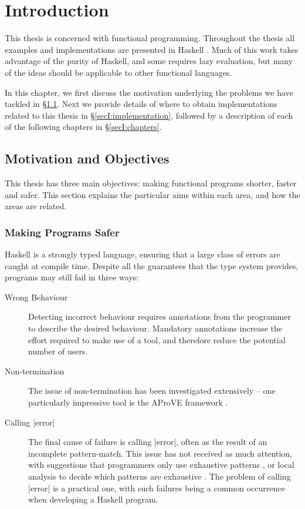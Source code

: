
\chapter{Introduction}
\label{chp:introduction}

This thesis is concerned with functional programming. Throughout the thesis all examples and implementations are presented in Haskell \cite{haskell}. Much of this work takes advantage of the purity of Haskell, and some requires lazy evaluation, but many of the ideas should be applicable to other functional languages.

In this chapter, we first discuss the motivation underlying the problems we have tackled in \S\ref{secI:motivation}. Next we provide details of where to obtain implementations related to this thesis in \S\ref{secI:implementation}, followed by a description of each of the following chapters in \S\ref{secI:chapters}.


\section{Motivation and Objectives}
\label{secI:motivation}

This thesis has three main objectives: making functional programs shorter, faster and safer. This section explains the particular aims within each area, and how the areas are related.

\subsection{Making Programs Safer}

Haskell is a strongly typed language, ensuring that a large class of errors are caught at compile time. Despite all the guarantees that the type system provides, programs may still fail in three ways:

\begin{description}
\item[Wrong Behaviour] Detecting incorrect behaviour requires annotations from the programmer to describe the desired behaviour. Mandatory annotations increase the effort required to make use of a tool, and therefore reduce the potential number of users.
\item[Non-termination] The issue of non-termination has been investigated extensively -- one particularly impressive tool is the AProVE framework \cite{aprove_haskell}.
\item[Calling |error|] The final cause of failure is calling |error|, often as the result of an incomplete pattern-match. This issue has not received as much attention, with suggestions that programmers only use exhaustive patterns \cite{turner:total}, or local analysis to decide which patterns are exhaustive \cite{maranget:pattern_warnings}. The problem of calling |error| is a practical one, with such failures being a common occurrence when developing a Haskell program.
\end{description}

